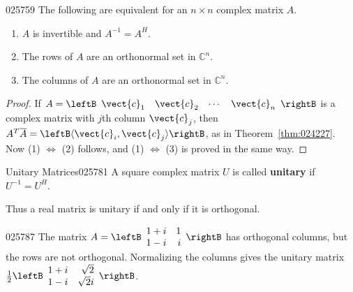 \begin{theorem}{}{025759}
The following are equivalent for an $n \times n$ complex matrix $A$.


\begin{enumerate}
\item $A$ is invertible and $A^{-1} = A^{H}$.

\item The rows of $A$ are an orthonormal set in $\mathbb{C}^n$.

\item The columns of $A$ are an orthonormal set in $\mathbb{C}^n$.

\end{enumerate}
\end{theorem}

\begin{proof}
If $A = \leftB \begin{array}{cccc}
\vect{c}_{1} & \vect{c}_{2} & \cdots & \vect{c}_{n}
\end{array}\rightB$ is a complex matrix with $j$th column $\vect{c}_{j}$, then $A^T\overline{A} = \leftB \langle \vect{c}_{i}, \vect{c}_{j}\rangle \rightB$, as in Theorem~\ref{thm:024227}. Now (1) $\Leftrightarrow$ (2) follows, and (1) $\Leftrightarrow$ (3) is proved in the same way.
\end{proof}

\begin{definition}{Unitary Matrices}{025781}
A square complex matrix $U$ is called \textbf{unitary} if $U^{-1} = U^{H}$.
\end{definition}

\noindent Thus a real matrix is unitary if and only if it is orthogonal.


\begin{example}{}{025787}
The matrix $A = \leftB \begin{array}{rr}
1 + i & 1 \\
1 - i & i
\end{array}\rightB$ has orthogonal columns, but the rows are not orthogonal. Normalizing the columns gives the unitary matrix $\frac{1}{2}\leftB \begin{array}{rr}
	1 + i & \sqrt{2} \\
	1 - i & \sqrt{2}i
\end{array}\rightB$.
\end{example}

